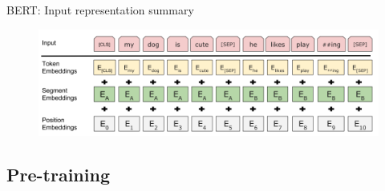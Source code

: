 \documentclass[12pt,aspectratio=169,handout]{beamer}
\begin{document}
\begin{frame}{BERT: Input representation summary}
	
	\begin{figure}
		\includegraphics[width=\linewidth]{img/bert-input.png}	
	\end{figure}
	
\end{frame}


\subsection{Pre-training}
\end{document}
